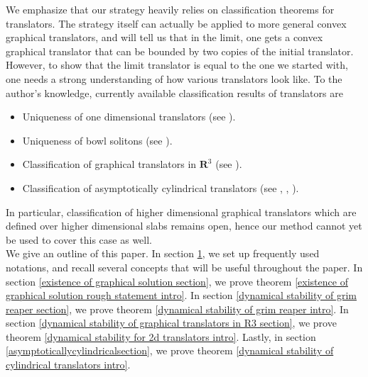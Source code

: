 \documentclass[pdflatex,sn-mathphys-num]{sn-jnl}%
\begin{document}
We emphasize that our strategy heavily relies on classification theorems for translators. The strategy itself can actually be applied to more general convex graphical translators, and will tell us that in the limit, one gets a convex graphical translator that can be bounded by two copies of the initial translator. However, to show that the limit translator is equal to the one we started with, one needs a strong understanding of how various translators look like. To the author's knowledge, currently available classification results of translators are
\begin{itemize}
    \item Uniqueness of one dimensional translators (see \cite{Halldorsson2010SelfsimilarST}).
     \item Uniqueness of bowl solitons (see \cite{Haslhofer2014UniquenessOT}).
    \item Classification of graphical translators in $\mathbf{R}^3$ (see \cite{Hoffman2018GraphicalTF}).
   
    \item Classification of asymptotically cylindrical translators (see \cite{Bamler2025-thclassification}, \cite{Bamler2025-pdeodi}, \cite{Choi2021ClassificationON}).
\end{itemize}
In particular, classification of higher dimensional graphical translators which are defined over higher dimensional slabs remains open, hence our method cannot yet be used to cover this case as well. \\

We give an outline of this paper. In section \ref{preliminaries section}, we set up frequently used notations, and recall several concepts that will be useful throughout the paper. In section \ref{existence of graphical solution section}, we prove theorem \ref{existence of graphical solution rough statement intro}. In section \ref{dynamical stability of grim reaper section}, we prove theorem \ref{dynamical stability of grim reaper intro}. In section \ref{dynamical stability of graphical translators in R3 section}, we prove theorem \ref{dynamical stability for 2d translators intro}. Lastly, in section \ref{asymptoticallycylindricalsection}, we prove theorem \ref{dynamical stability of cylindrical translators intro}.
\section{}\label{preliminaries section}
\end{document}
